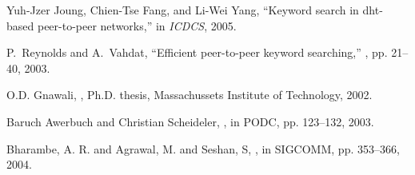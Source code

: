 \documentclass[fleqn,12pt,twoside]{article}
\begin{document}
\begin{thebibliography}{10}
Yuh-Jzer Joung, Chien-Tse Fang, and Li-Wei Yang,
\newblock ``Keyword search in dht-based peer-to-peer networks,''
\newblock in {\em ICDCS}, 2005.

P.~Reynolds and A.~Vahdat,
\newblock ``{Efficient peer-to-peer keyword searching},''
, pp. 21--40, 2003.

O.D. Gnawali,
,
\newblock Ph.D. thesis, Massachussets Institute of Technology, 2002.


Baruch Awerbuch and Christian Scheideler,
,
\newblock in {PODC}, pp. 123--132, 2003.

Bharambe, A. R. and Agrawal, M. and Seshan, S,
,
\newblock in {SIGCOMM}, pp. 353--366, 2004.



\end{thebibliography}
\end{document}

